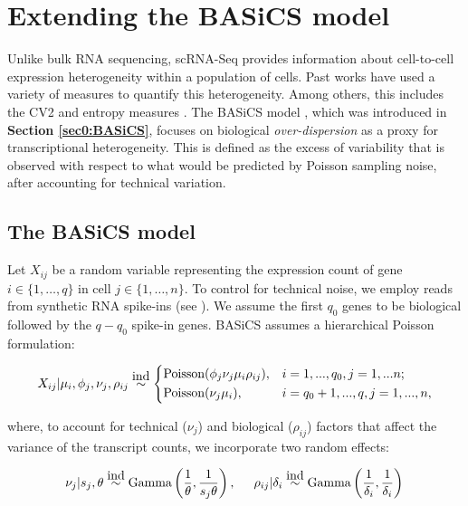 
\section{Extending the  BASiCS model}

Unlike bulk RNA sequencing, scRNA-Seq provides information about cell-to-cell expression heterogeneity within a population of cells. Past works have used a variety of measures to quantify this heterogeneity. Among others, this includes the \gls{CV2} \citep{Brennecke2013} and entropy measures \citep{Richard2016}. The BASiCS model \citep{Vallejos2015BASiCS, Vallejos2016}, which was introduced in \textbf{Section \ref{sec0:BASiCS}}, focuses on biological \textit{over-dispersion} as a proxy for transcriptional heterogeneity. This is defined as the excess of variability that is observed with respect to what would be predicted by Poisson sampling noise, after accounting for technical variation. 

\subsection{The BASiCS model}

Let $X_{ij}$ be a random variable representing the expression count of gene $i \in \{1, \ldots, q\}$ in cell $j \in \{ 1, \ldots ,n\}$.  To control for technical noise, we employ reads from synthetic RNA spike-ins (see \citep{Jiang2011}). We assume the first $q_0$ genes to be biological followed by the $q-q_0$ spike-in genes. BASiCS assumes a hierarchical Poisson formulation: 

\begin{equation} \label{eq::PoissonBASiCS}
 X_{ij}|\mu_i,\phi_j,\nu_j,\rho_{ij} \stackrel{\mbox{ind}}{\sim}
 \left\lbrace
  \begin{aligned}
    &\text{Poisson}(\phi_j\nu_j\mu_i\rho_{ij}), && i=1,...,q_0,j=1,...n;  \\ 
    &\text{Poisson}(\nu_j\mu_i), && i=q_0+1,...,q,j=1,...,n,    	    
  \end{aligned}
\right.
\end{equation} 

where, to account for technical ($\nu_j$) and biological ($\rho_{ij}$) factors that affect the variance of the transcript counts, we incorporate two random effects: 

\begin{equation} \label{eq::RandomEffectsBASiCS}
\nu_j|s_j,\theta \stackrel{\mbox{ind}}{\sim} \text{Gamma}\left(\frac{1}{\theta},\frac{1}{s_j\theta}\right), \hspace{0.5cm} \rho_{ij}|\delta_i  \stackrel{\mbox{ind}}{\sim} \text{Gamma}\left(\frac{1}{\delta_i},\frac{1}{\delta_i}\right)\\
\end{equation} 

